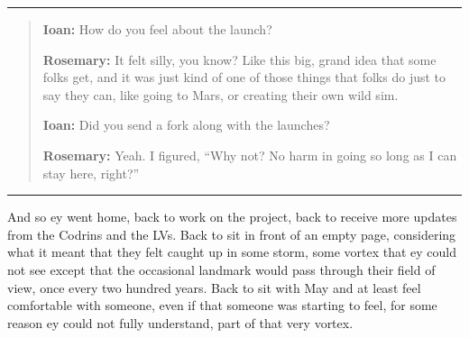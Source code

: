 \begin{center}\rule{0.5\linewidth}{0.5pt}\end{center}

\begin{quote}
\textbf{Ioan:} How do you feel about the launch?

\textbf{Rosemary:} It felt silly, you know? Like this big, grand idea that some folks get, and it was just kind of one of those things that folks do just to say they can, like going to Mars, or creating their own wild sim.

\textbf{Ioan:} Did you send a fork along with the launches?

\textbf{Rosemary:} Yeah. I figured, ``Why not? No harm in going so long as I can stay here, right?''
\end{quote}

\begin{center}\rule{0.5\linewidth}{0.5pt}\end{center}

And so ey went home, back to work on the project, back to receive more updates from the Codrins and the LVs. Back to sit in front of an empty page, considering what it meant that they felt caught up in some storm, some vortex that ey could not see except that the occasional landmark would pass through their field of view, once every two hundred years. Back to sit with May and at least feel comfortable with someone, even if that someone was starting to feel, for some reason ey could not fully understand, part of that very vortex.

